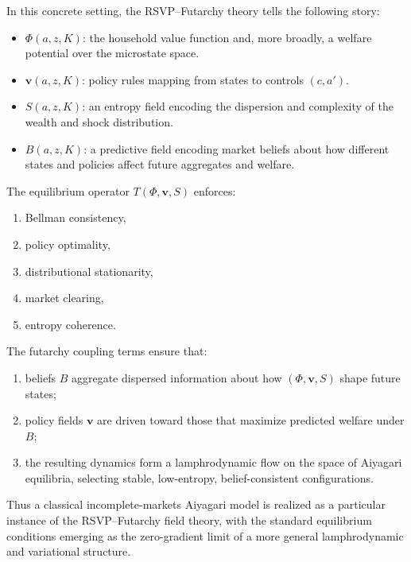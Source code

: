 \documentclass[12pt]{article}
\begin{document}
In this concrete setting, the RSVP--Futarchy theory tells the following
story:
\begin{itemize}
    \item $\Phi(a,z,K)$: the household value function and, more broadly,
    a welfare potential over the microstate space.
    \item $\mathbf{v}(a,z,K)$: policy rules mapping from states to
    controls $(c,a')$.
    \item $S(a,z,K)$: an entropy field encoding the dispersion and
    complexity of the wealth and shock distribution.
    \item $B(a,z,K)$: a predictive field encoding market beliefs about
    how different states and policies affect future aggregates and
    welfare.
\end{itemize}

The equilibrium operator $T(\Phi,\mathbf{v},S)$ enforces:
\begin{enumerate}
    \item Bellman consistency,
    \item policy optimality,
    \item distributional stationarity,
    \item market clearing,
    \item entropy coherence.
\end{enumerate}

The futarchy coupling terms ensure that:
\begin{enumerate}
    \item beliefs $B$ aggregate dispersed information about how
    $(\Phi,\mathbf{v},S)$ shape future states;
    \item policy fields $\mathbf{v}$ are driven toward those that
    maximize predicted welfare under $B$;
    \item the resulting dynamics form a lamphrodynamic flow on the
    space of Aiyagari equilibria, selecting stable, low-entropy,
    belief-consistent configurations.
\end{enumerate}

Thus a classical incomplete-markets Aiyagari model is realized as a
particular instance of the RSVP--Futarchy field theory, with the
standard equilibrium conditions emerging as the zero-gradient limit of a
more general lamphrodynamic and variational structure.

\end{document}
